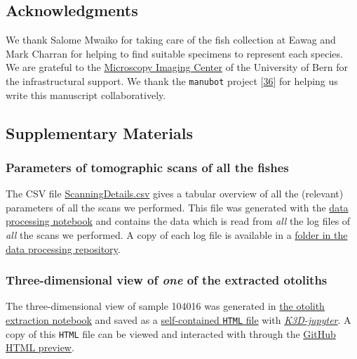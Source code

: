 \hypertarget{acknowledgments}{%
\subsection{Acknowledgments}\label{acknowledgments}}

We thank Salome Mwaiko for taking care of the fish collection at Eawag and Mark Charran for helping to find suitable specimens to represent each species.
We are grateful to the \href{https//www.mic.unibe.ch/}{Microscopy Imaging Center} of the University of Bern for the infrastructural support.
We thank the \texttt{manubot} project {[}\protect\hyperlink{ref-YuJbg3zO}{36}{]} for helping us write this manuscript collaboratively.

\hypertarget{supplementary-materials}{%
\subsection{Supplementary Materials}\label{supplementary-materials}}

\hypertarget{parameters-of-tomographic-scans-of-all-the-fishes}{%
\subsubsection{Parameters of tomographic scans of all the fishes}\label{parameters-of-tomographic-scans-of-all-the-fishes}}

The CSV file \href{https://github.com/habi/EAWAG-manuscript/blob/main/content/data/ScanningDetails.csv}{ScanningDetails.csv} gives a tabular overview of all the (relevant) parameters of all the scans we performed.
This file was generated with the \href{https://github.com/habi/EAWAG/blob/master/DataWrangling.ipynb}{data processing notebook} and contains the data which is read from \emph{all} the log files of \emph{all} the scans we performed.
A copy of each log file is available in a \href{https://github.com/habi/EAWAG/tree/master/logfiles}{folder in the data processing repository}.

\hypertarget{three-dimensional-view-of-one-of-the-extracted-otoliths}{%
\subsubsection{\texorpdfstring{Three-dimensional view of \emph{one} of the extracted otoliths}{Three-dimensional view of one of the extracted otoliths}}\label{three-dimensional-view-of-one-of-the-extracted-otoliths}}

The three-dimensional view of sample 104016 was generated in \href{https://github.com/habi/EAWAG/blob/master/ExtractOtoliths.ipynb}{the otolith extraction notebook} and saved as a \href{https://github.com/habi/EAWAG-manuscript/blob/main/content/data/104016.head.rec.otolith.region.3D.html}{self-contained \texttt{HTML} file} with \href{https://github.com/K3D-tools/K3D-jupyter}{\emph{K3D-jupyter}}.
A copy of this \texttt{HTML} file can be viewed and interacted with through the \href{https://htmlpreview.github.io/?https://github.com/habi/EAWAG-manuscript/blob/main/content/data/104016.head.rec.otolith.region.3D.html}{GitHub HTML preview}.

